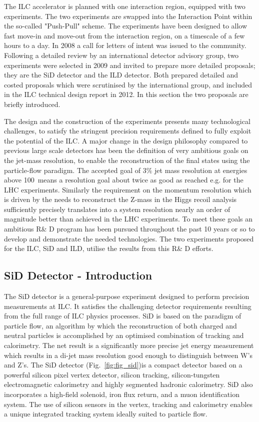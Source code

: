 The ILC accelerator is planned with one interaction region, equipped with two experiments. The two experiments are swapped into the Interaction Point within the so-called "Push-Pull" scheme. The experiments have been designed to allow fast move-in and move-out from the interaction region, on a timescale of a few hours to a day. In 2008 a call for letters of intent was issued to the community. Following a detailed review by an international detector advisory group, two experiments were selected in 2009 and invited to prepare more detailed proposals; they are the SiD detector and the ILD detector. Both prepared detailed and costed proposals which were scrutinised by the international group, and included in the ILC technical design report in 2012. In this section the two proposals are briefly introduced.

The design and the construction of the experiments presents many technological challenges, to satisfy the stringent precision requirements defined to fully exploit the potential of the ILC. A major change in the design philosophy compared to previous large scale detectors has been the definition of very ambitious goals on the jet-mass resolution, to enable the reconstruction of the final states using the particle-flow paradigm. The accepted goal of $3\%$ jet mass resolution at energies above 100~\GeV means a resolution goal about twice as good as reached e.g. for the LHC experiments. Similarly the requirement on the momentum resolution which is driven by the needs to reconstruct the Z-mass in the Higgs recoil analysis sufficiently precisely translates into a system resolution nearly an order of magnitude better than achieved in the LHC experiments. To meet these goals an ambitious R\& D program has been pursued throughout the past 10 years or so to develop and demonstrate the needed technologies. The two experiments proposed for the ILC, SiD and ILD, utilise the results from this R\& D efforts. 

\subsection{SiD Detector - Introduction}
The SiD detector is a general-purpose experiment designed to perform precision measurements
at ILC. It satisfies the challenging detector requirements resulting from the full range of ILC physics processes. SiD is based on the paradigm of particle flow, an algorithm by which
the reconstruction of both charged and neutral particles is accomplished by an optimised
combination of tracking and calorimetry. The net result is a significantly more precise jet
energy measurement which results in a di-jet mass resolution good enough to distinguish
between W’s and Z’s.
The SiD detector (Fig.~\ref{fig:fig_sid})is a compact detector based on a powerful silicon
pixel vertex detector, silicon tracking, silicon-tungsten electromagnetic calorimetry and
highly segmented hadronic calorimetry. 
SiD also incorporates a high-field solenoid, iron
flux return, and a muon identification system. The use of silicon sensors in the vertex, tracking
and calorimetry enables a unique integrated tracking system ideally suited to particle
flow.

